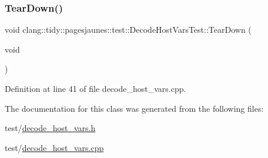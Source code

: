 \subsubsection{\texorpdfstring{Tear\+Down()}{TearDown()}}
{\footnotesize\ttfamily void clang\+::tidy\+::pagesjaunes\+::test\+::\+Decode\+Host\+Vars\+Test\+::\+Tear\+Down (\begin{DoxyParamCaption}\item[{void}]{ }\end{DoxyParamCaption})\hspace{0.3cm}{\ttfamily [virtual]}}



Definition at line 41 of file decode\+\_\+host\+\_\+vars.\+cpp.



The documentation for this class was generated from the following files\+:\begin{DoxyCompactItemize}
\item 
test/\hyperlink{decode__host__vars_8h}{decode\+\_\+host\+\_\+vars.\+h}\item 
test/\hyperlink{decode__host__vars_8cpp}{decode\+\_\+host\+\_\+vars.\+cpp}\end{DoxyCompactItemize}
